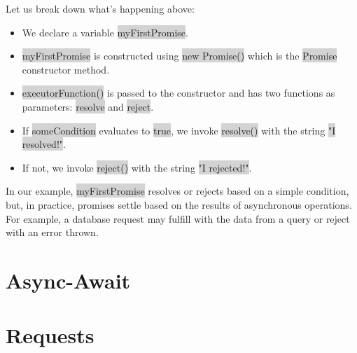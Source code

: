 \documentclass[11pt]{article}
\begin{document}
Let us break down what’s happening above:
\begin{itemize}[leftmargin = *]
\item We declare a variable \colorbox{lightgray}{myFirstPromise}. 
\item \colorbox{lightgray}{myFirstPromise} is constructed using \colorbox{lightgray}{new Promise()} which is the \colorbox{lightgray}{Promise} constructor method.
\item \colorbox{lightgray}{executorFunction()} is passed to the constructor and has two functions as parameters: \colorbox{lightgray}{resolve} and \colorbox{lightgray}{reject}.
\item If \colorbox{lightgray}{someCondition} evaluates to \colorbox{lightgray}{true}, we invoke \colorbox{lightgray}{resolve()} with the string \colorbox{lightgray}{"I resolved!"}. 
\item If not, we invoke \colorbox{lightgray}{reject()} with the string \colorbox{lightgray}{"I rejected!"}.
\end{itemize}
In our example, \colorbox{lightgray}{myFirstPromise} resolves or rejects based on a simple condition, but, in practice, promises settle based on the results of asynchronous operations. For example, a database request may fulfill with the data from a query or reject with an error thrown. 












\newpage
\section{Async-Await}
\newpage
\section{Requests}
\end{document}
